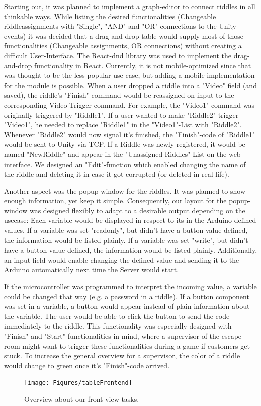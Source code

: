 Starting out, it was planned to implement a graph-editor to connect riddles in all thinkable ways.
While listing the desired functionalities (Changeable riddleassignments with "Single", "AND" and "OR" connections to the Unity-events) it was decided that a drag-and-drop table would supply most of those functionalities (Changeable assignments, OR connections) without creating a difficult User-Interface.
The React-dnd library \parencite{reactDND} was used to implement the drag-and-drop functionality in React. 
Currently, it is not mobile-optimized since that was thought to be the less popular use case, but adding a mobile implementation for the module is possible.
When a user dropped a riddle into a "Video" field (and saved), the riddle's "Finish"-command would be reassigned on input to the corresponding Video-Trigger-command.
For example, the "Video1" command was originally triggered by "Riddle1".
If a user wanted to make "Riddle2" trigger "Video1", he needed to replace "Riddle1" in the "Video1"-List with "Riddle2".
Whenever "Riddle2" would now signal it's finished, the "Finish"-code of "Riddle1" would be sent to Unity via TCP.
If a Riddle was newly registered, it would be named "NewRiddle" and appear in the "Unassigned Riddles"-List on the web interface.
We designed an "Edit"-function which enabled changing the name of the riddle and deleting it in case it got corrupted (or deleted in real-life).

Another aspect was the popup-window for the riddles. It was planned to show enough information, yet keep it simple.
Consequently, our layout for the popup-window was designed flexibly to adapt to a desirable output depending on the usecase:
Each variable would be displayed in respect to its in the Arduino defined values.
If a variable was set "readonly", but didn't have a button value defined, the information would be listed plainly.
If a variable was set "write", but didn't have a button value defined, the information would be listed plainly.
Additionally, an input field would enable changing the defined value and sending it to the Arduino automatically next time the Server would start.

If the microcontroller was programmed to interpret the incoming value, a variable could be changed that way (e.g. a password in a riddle).
If a button component was set in a variable, a button would appear instead of plain information about the variable.
The user would be able to click the button to send the code immediately to the riddle.
This functionality was especially designed with "Finish" and "Start" functionalities in mind, where a supervisor of the escape room might want to trigger these functionalities during a game if customers get stuck.
To increase the general overview for a supervisor, the color of a riddle would change to green once it's "Finish"-code arrived.

\begin{figure}[th]
	\centering
	\texttt{[image: Figures/tableFrontend]}
	\decoRule
	\caption[FrontViewTable]{Overview about our front-view tasks.}
	\label{fig:FrontViewTable}
\end{figure}



